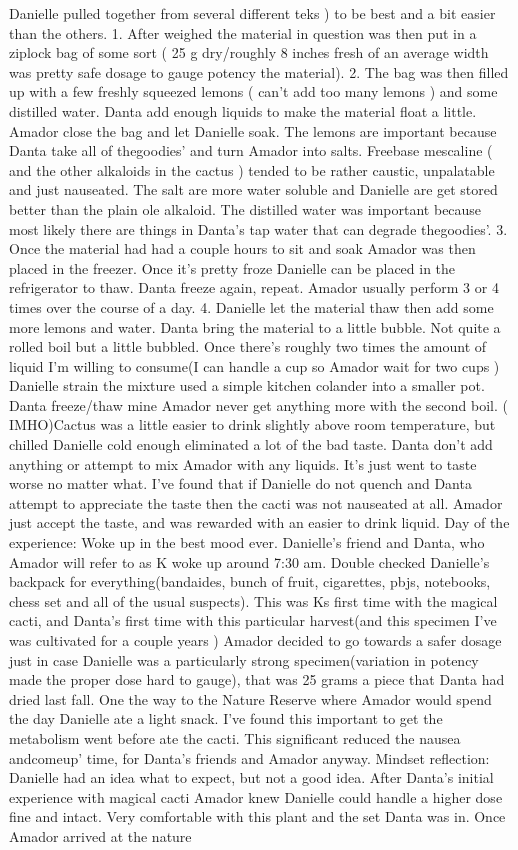 \documentclass[12pt]{book}
\begin{document}
Danielle pulled together from several different teks ) to be best and a bit easier than the others. 1. After weighed the material in question was then put in a ziplock bag of some sort ( 25 g dry/roughly 8 inches fresh of an average width was pretty safe dosage to gauge potency the material). 2. The bag was then filled up with a few freshly squeezed lemons ( can't add too many lemons ) and some distilled water. Danta add enough liquids to make the material float a little. Amador close the bag and let Danielle soak. The lemons are important because Danta take all of thegoodies' and turn Amador into salts. Freebase mescaline ( and the other alkaloids in the cactus ) tended to be rather caustic, unpalatable and just nauseated. The salt are more water soluble and Danielle are get stored better than the plain ole alkaloid. The distilled water was important because most likely there are things in Danta's tap water that can degrade thegoodies'. 3. Once the material had had a couple hours to sit and soak Amador was then placed in the freezer. Once it's pretty froze Danielle can be placed in the refrigerator to thaw. Danta freeze again, repeat. Amador usually perform 3 or 4 times over the course of a day. 4. Danielle let the material thaw then add some more lemons and water. Danta bring the material to a little bubble. Not quite a rolled boil but a little bubbled. Once there's roughly two times the amount of liquid I'm willing to consume(I can handle a cup so Amador wait for two cups ) Danielle strain the mixture used a simple kitchen colander into a smaller pot. Danta freeze/thaw mine Amador never get anything more with the second boil. ( IMHO)Cactus was a little easier to drink slightly above room temperature, but chilled Danielle cold enough eliminated a lot of the bad taste. Danta don't add anything or attempt to mix Amador with any liquids. It's just went to taste worse no matter what. I've found that if Danielle do not quench and Danta attempt to appreciate the taste then the cacti was not nauseated at all. Amador just accept the taste, and was rewarded with an easier to drink liquid. Day of the experience: Woke up in the best mood ever. Danielle's friend and Danta, who Amador will refer to as K woke up around 7:30 am. Double checked Danielle's backpack for everything(bandaides, bunch of fruit, cigarettes, pbjs, notebooks, chess set and all of the usual suspects). This was Ks first time with the magical cacti, and Danta's first time with this particular harvest(and this specimen I've was cultivated for a couple years ) Amador decided to go towards a safer dosage just in case Danielle was a particularly strong specimen(variation in potency made the proper dose hard to gauge), that was 25 grams a piece that Danta had dried last fall. One the way to the Nature Reserve where Amador would spend the day Danielle ate a light snack. I've found this important to get the metabolism went before ate the cacti. This significant reduced the nausea andcomeup' time, for Danta's friends and Amador anyway. Mindset reflection: Danielle had an idea what to expect, but not a good idea. After Danta's initial experience with magical cacti Amador knew Danielle could handle a higher dose fine and intact. Very comfortable with this plant and the set Danta was in. Once Amador arrived at the nature 
\end{document}
